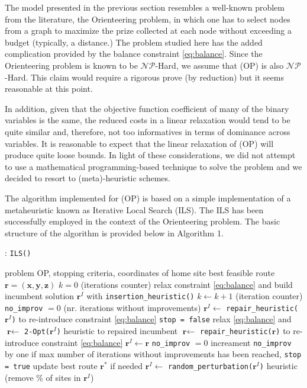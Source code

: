 \documentclass[12pt]{article}
\begin{document}
The model presented in the previous section resembles a well-known problem
from the literature, the Orienteering problem, in which one has to select nodes
from a graph to maximize the prize collected at each node without exceeding a
budget (typically, a distance.) The problem studied here has the added
complication provided by the balance constraint \eqref{eq:balance}. Since the
Orienteering problem is known to be $\mathcal{NP}$-Hard, we assume that (OP) is
also $\mathcal{NP}$-Hard. This claim would require a rigorous prove (by
reduction) but it seems reasonable at this point.

In addition, given that the objective function coefficient of many of the binary
variables is the same, the reduced costs in a linear relaxation would tend to
be quite similar and, therefore, not too informatives in terms of dominance
across variables. It is reasonable to expect that the linear relaxation of
(OP) will produce quite loose bounds. In light of these considerations, we did
not attempt to use a mathematical programming-based technique to solve the
problem and we decided to resort to (meta)-heuristic schemes.

The algorithm implemented for (OP) is based on a simple implementation of a
metaheuristic known as
Iterative Local Search (ILS). The ILS has been successfully
employed in the context of the Orienteering problem. The basic structure of the
algorithm is provided below in Algorithm 1.

\begin{algorithm}
  \caption{: \texttt{ILS()} } \label{algo:generalCM}
  \begin{algorithmic}[1]
    \REQUIRE problem OP, stopping criteria, coordinates of home site
    \ENSURE best feasible route $\textbf{r} = \left(\mathbf{x}, \mathbf{y},
    \mathbf{z}\right)$
    \STATE $k = 0$ (iterations counter)
    \STATE relax constraint \eqref{eq:balance} and build incumbent solution
    $\textbf{r}^I$ with \texttt{insertion\_heuristic()}
    \STATE $k \leftarrow k+1$ (iteration counter)
    \STATE \texttt{no\_improv} $=0$ (nr.  iterations without improvements)
    \STATE $\textbf{r}^I \leftarrow$ \texttt{repair\_heuristic($\textbf{r}^I$)} to re-introduce constraint \eqref{eq:balance}
    \STATE \texttt{stop = false}
    \STATE relax \eqref{eq:balance} and $\textbf{r} \leftarrow$ \texttt{2-Opt($\textbf{r}^I$)} heuristic to repaired incumbent
    \STATE $\textbf{r} \leftarrow$ \texttt{repair\_heuristic($\textbf{r}$)} to re-introduce constraint \eqref{eq:balance} 
    \STATE $\textbf{r}^I \leftarrow \textbf{r}$
    \STATE \texttt{no\_improv} $=0$
    \ELSE
    \STATE increament \texttt{no\_improv} by one
    \STATE if max number of iterations without improvements has been reached,
    \texttt{stop = true}
    \ENDIF
    \ENDWHILE
    \STATE update best route $\textbf{r}^*$ if needed
    \STATE $\textbf{r}^I \leftarrow$
    \texttt{random\_perturbation($\textbf{r}^I$)} heuristic
    (remove \% of sites in $\textbf{r}^I$)
    \ENDWHILE
  \end{algorithmic}
\end{algorithm}
\end{document}
